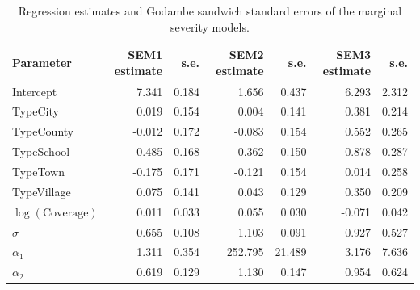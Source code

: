 \begin{table}[h!]
\centering
\begin{tabular}{lrrrrrr}
\toprule
Parameter & SEM1 estimate & s.e. & SEM2 estimate & s.e. & SEM3 estimate & s.e. \\
\midrule
Intercept & 7.341 & 0.184 & 1.656 & 0.437 & 6.293 & 2.312 \\
TypeCity & 0.019 & 0.154 & 0.004 & 0.141 & 0.381 & 0.214 \\
TypeCounty & -0.012 & 0.172 & -0.083 & 0.154 & 0.552 & 0.265 \\
TypeSchool & 0.485 & 0.168 & 0.362 & 0.150 & 0.878 & 0.287 \\
TypeTown & -0.175 & 0.171 & -0.121 & 0.154 & 0.014 & 0.258 \\
TypeVillage & 0.075 & 0.141 & 0.043 & 0.129 & 0.350 & 0.209 \\
$\log(\mathrm{Coverage})$ & 0.011 & 0.033 & 0.055 & 0.030 & -0.071 & 0.042 \\
$\sigma$ & 0.655 & 0.108 & 1.103 & 0.091 & 0.927 & 0.527 \\
$\alpha_1$ & 1.311 & 0.354 & 252.795 & 21.489 & 3.176 & 7.636 \\
$\alpha_2$ & 0.619 & 0.129 & 1.130 & 0.147 & 0.954 & 0.624 \\
\bottomrule
\end{tabular}
\caption{Regression estimates and Godambe sandwich standard errors of the marginal severity models.}
\label{marginalY}
\end{table}
